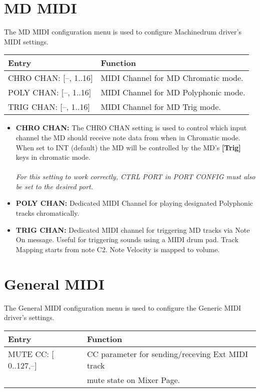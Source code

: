 \newpage

\section{MD MIDI}
The MD MIDI configuration menu is used to configure Machinedrum driver's MIDI settings.
\\
\begin{tabular}{|l|l|}
\hline
\rowcolor[HTML]{C0C0C0} 
Entry                                  & Function                                                                       \\ \hline
CHRO CHAN: {[}--, 1..16{]}        & MIDI Channel for MD Chromatic mode. \\ \hline
POLY CHAN: {[}--, 1..16{]}         & MIDI Channel for MD Polyphonic mode. \\ \hline
TRIG CHAN: {[}--, 1..16{]}        & MIDI Channel for MD Trig mode. \\ \hline
\end{tabular}

\begin{itemize}
\item{\textbf{CHRO CHAN:} The CHRO CHAN setting is used to control which input channel the MD should receive note data from when in Chromatic mode. When set to INT (default) the MD will be controlled by the MD's \textbf{[Trig]} keys in chromatic mode. \\\\\textit{For this setting to work correctly, CTRL PORT in PORT CONFIG must also be set to the desired port.}}

\item{\textbf{POLY CHAN:} Dedicated MIDI Channel for playing designated Polyphonic tracks chromatically.}
\item{\textbf{TRIG CHAN:} Dedicated MIDI channel for triggering MD tracks via Note On message. Useful for triggering sounds using a MIDI drum pad. Track Mapping starts from note C2. Note Velocity is mapped to volume.}
\end{itemize}

\section{General MIDI}
The General MIDI configuration menu is used to configure the Generic MIDI driver's settings.
\\
\begin{tabular}{|l|l|}
\hline
\rowcolor[HTML]{C0C0C0} 
Entry                                  & Function                                                                       \\ \hline
MUTE CC: {[} 0..127,--{]}        & CC parameter for sending/receving Ext MIDI track\\& mute state on Mixer Page. \\ 
\hline
\end{tabular}